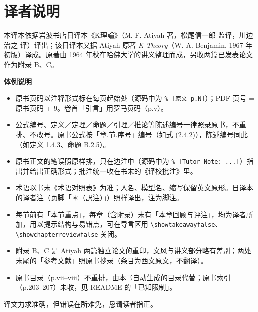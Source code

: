 \chapter*{译者说明}

本译本依据岩波书店日译本《K理論》（M. F. Atiyah 著，松尾信一郎 监译，川边治之 译）译出；该日译本又据 Atiyah 原著 \textit{K-Theory}（W. A. Benjamin, 1967 年初版）译成。原著由 1964 年秋在哈佛大学的讲义整理而成，另收两篇已发表论文作为附录 B、C。

\medskip
\noindent\textbf{体例说明}
\begin{itemize}[leftmargin=2em,itemsep=2pt]
\item 原书页码以注释形式标在每页起始处（源码中为 \verb|% [原文 p.N]|）；PDF 页号 = 原书页码 + 9。卷首「引言」用罗马页码（p.v）。
\item 公式编号、定义／定理／命题／引理／推论等陈述编号一律照录原书，不重排、不改号。原书公式按「章.节.序号」编号（如式 (2.4.2)），陈述编号同此（如定义 1.4.3、命题 B.2.5）。
\item 原书正文的笔误照原样排，只在边注中（源码中为 \verb|% [Tutor Note: ...]|）指出并给出正确形式；批注统一收在书末的《译校批注》里。
\item 术语以书末《术语对照表》为准；人名、模型名、缩写保留英文原形。日译本的译者注（页脚「＊（訳注）」）照样译出，注为脚注。
\item 每节前有「本节重点」，每章（含附录）末有「本章回顾与评注」，均为译者所加，用以提示结构与易错点，可在导言区用 \verb|\showtakeawayfalse|、\verb|\showchapterreviewfalse| 关闭。
\item 附录 B、C 是 Atiyah 两篇独立论文的重印，文风与讲义部分略有差别；两处末尾的「参考文献」照原书抄录（条目为西文原文，不翻译）。
\item 原书目录（p.vii–viii）不重排，由本书自动生成的目录代替；原书索引（p.203–207）未收，见 README 的「已知限制」。
\end{itemize}

\medskip
\noindent 译文力求准确，但错误在所难免，恳请读者指正。
